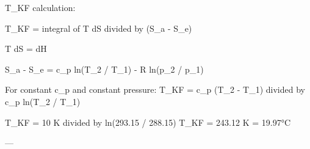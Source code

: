 T_KF calculation:  

T_KF = integral of T dS divided by (S_a - S_e)  

T dS = dH  

S_a - S_e = c_p ln(T_2 / T_1) - R ln(p_2 / p_1)  

For constant c_p and constant pressure:  
T_KF = c_p (T_2 - T_1) divided by c_p ln(T_2 / T_1)  

T_KF = 10 K divided by ln(293.15 / 288.15)  
T_KF = 243.12 K = 19.97°C  

---